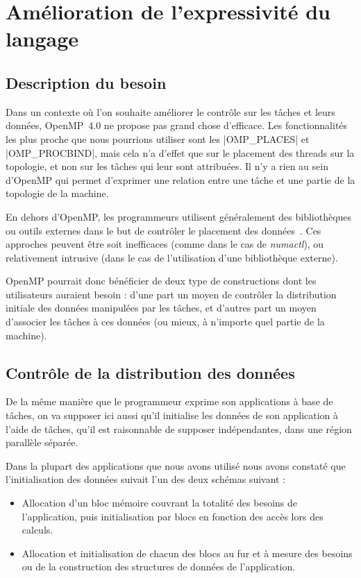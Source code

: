 \section{Amélioration de l'expressivité du langage}\label{sec:openmp:langage}

\subsection{Description du besoin}

Dans un contexte où l'on souhaite améliorer le contrôle sur les tâches et leurs données, OpenMP~4.0 ne propose pas grand chose d'efficace.
Les fonctionnalités les plus proche que nous pourrions utiliser sont les |OMP_PLACES| et |OMP_PROCBIND|, mais cela n'a d'effet que sur le placement des threads sur la topologie, et non sur les tâches qui leur sont attribuées. Il n'y a rien au sein d'OpenMP qui permet d'exprimer une relation entre une tâche et une partie de la topologie de la machine.

En dehors d'OpenMP, les programmeurs utilisent généralement des bibliothèques ou outils externes dans le but de contrôler le placement des données~\cite{Pousa2009, Broquedis2010a}.
Ces approches peuvent être soit inefficaces (comme dans le cas de \emph{numactl}), ou relativement intrusive (dans le cas de l'utilisation d'une bibliothèque externe).

OpenMP pourrait donc bénéficier de deux type de constructions dont les utilisateurs auraient besoin : d'une part un moyen de contrôler la distribution initiale des données manipulées par les tâches, et d'autres part un moyen d'associer les tâches à ces données (ou mieux, à n'importe quel partie de la machine).

\subsection{Contrôle de la distribution des données}\label{sec:openmp:langage:init}

De la même manière que le programmeur exprime son applications à base de tâches, on va supposer ici aussi qu'il initialise les données de son application à l'aide de tâches, qu'il est raisonnable de supposer indépendantes, dans une région parallèle séparée.

Dans la plupart des applications que nous avons utilisé nous avons constaté que l'initialisation des données suivait l'un des deux schémas suivant :
\begin{itemize}
    \item Allocation d'un bloc mémoire couvrant la totalité des besoins de l'application, puis initialisation par blocs en fonction des accès lors des calculs.
  \item Allocation et initialisation de chacun des blocs au fur et à mesure des besoins ou de la construction des structures de données de l'application.
\end{itemize}

